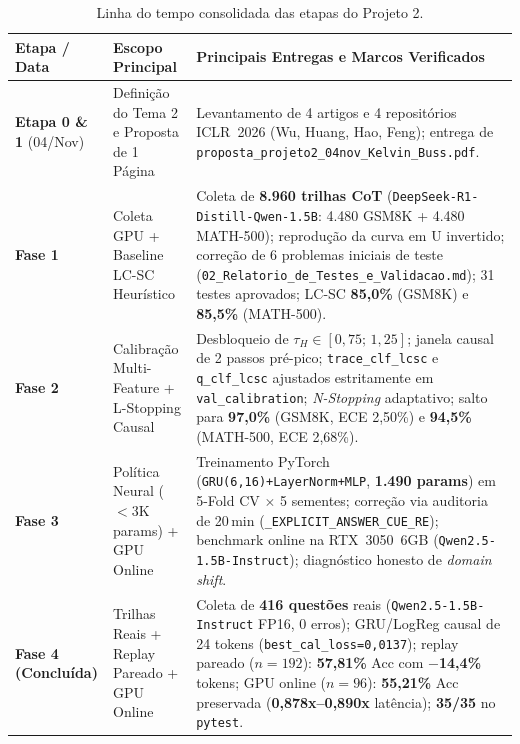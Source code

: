\documentclass[11pt,a4paper]{article}
\begin{document}
\begin{table}[H]
\centering
\caption{Linha do tempo consolidada das etapas do Projeto 2.}
\label{tab:cronologia}
\small
\begin{tabular}{@{}p{2.4cm}p{4.1cm}p{9.2cm}@{}}
\toprule
\textbf{Etapa / Data} & \textbf{Escopo Principal} & \textbf{Principais Entregas e Marcos Verificados} \\
\midrule
\textbf{Etapa 0 \& 1} (04/Nov) & Definição do Tema 2 e Proposta de 1 Página & Levantamento de 4 artigos e 4 repositórios ICLR~2026 (Wu, Huang, Hao, Feng); entrega de \texttt{proposta\_projeto2\_04nov\_Kelvin\_Buss.pdf}. \\
\addlinespace
\textbf{Fase 1} & Coleta GPU + Baseline LC-SC Heurístico & Coleta de \textbf{8.960 trilhas CoT} (\texttt{DeepSeek-R1-Distill-Qwen-1.5B}: 4.480 GSM8K + 4.480 MATH-500); reprodução da curva em U invertido; correção de 6 problemas iniciais de teste (\texttt{02\_Relatorio\_de\_Testes\_e\_Validacao.md}); 31 testes aprovados; LC-SC \textbf{85,0\%} (GSM8K) e \textbf{85,5\%} (MATH-500). \\
\addlinespace
\textbf{Fase 2} & Calibração Multi-Feature + L-Stopping Causal & Desbloqueio de $\tau_H \in [0{,}75;\, 1{,}25]$; janela causal de 2 passos pré-pico; \texttt{trace\_clf\_lcsc} e \texttt{q\_clf\_lcsc} ajustados estritamente em \texttt{val\_calibration}; \emph{N-Stopping} adaptativo; salto para \textbf{97,0\%} (GSM8K, ECE 2,50\%) e \textbf{94,5\%} (MATH-500, ECE 2,68\%). \\
\addlinespace
\textbf{Fase 3} & Política Neural ($<3$K params) + GPU Online & Treinamento PyTorch (\texttt{GRU(6,16)+LayerNorm+MLP}, \textbf{1.490 params}) em 5-Fold CV $\times$ 5 sementes; correção via auditoria de 20\,min (\texttt{\_EXPLICIT\_ANSWER\_CUE\_RE}); benchmark online na RTX~3050~6GB (\texttt{Qwen2.5-1.5B-Instruct}); diagnóstico honesto de \emph{domain shift}. \\
\addlinespace
\textbf{Fase 4 (Concluída)} & Trilhas Reais + Replay Pareado + GPU Online & Coleta de \textbf{416 questões} reais (\texttt{Qwen2.5-1.5B-Instruct} FP16, 0 erros); GRU/LogReg causal de 24 tokens (\texttt{best\_cal\_loss=0,0137}); replay pareado ($n=192$): \textbf{57,81\%} Acc com \textbf{$-$14,4\%} tokens; GPU online ($n=96$): \textbf{55,21\%} Acc preservada (\textbf{0,878x--0,890x} latência); \textbf{35/35} no \texttt{pytest}. \\
\bottomrule
\end{tabular}
\end{table}
\end{document}

